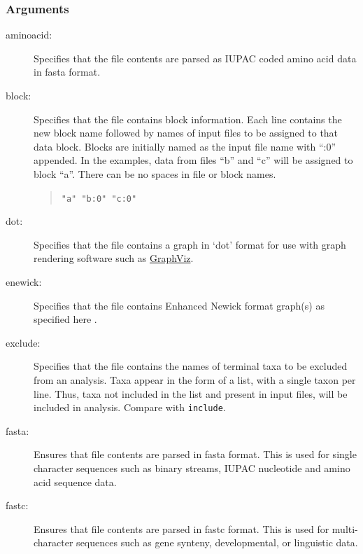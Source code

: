 	\subsubsection{Arguments}
	
	\begin{description}
		\item [aminoacid:] Specifies that the file contents are parsed as IUPAC coded amino 
		acid data in fasta \citep{PearsonandLipman1988} format.

		\item [block:] Specifies that the file contains block %
		information. Each line contains 
		the new block name followed by names of input files to be assigned to that data block. 
		Blocks are initially named as the input file name with ``:0'' appended. In the examples, 
		data from files ``b'' and ``c'' will be assigned to block ``a''. There can be no spaces in 
		file or block names.
			
			\begin{quote}
					\texttt{"a" "b:0" "c:0"}
			\end{quote}
	
		\item [dot:] Specifies that the file contains a graph in `dot' format for use with graph 
		rendering software such as \href{https://en.wikipedia.org/wiki/Graphviz}{GraphViz}.
			
		\item [enewick:] Specifies that the file contains Enhanced Newick format graph(s) as
		specified here \citep{Cardonaetal2008}. 
			
		\item [exclude:] Specifies that the file contains the names of terminal taxa to be 
		excluded from an analysis. Taxa appear in the form of a list, with a single taxon per 
		line. Thus, taxa not included in the list and present in input files, will be included in 
		analysis. Compare with \texttt{include}.
			
		\item [fasta:] Ensures that file contents are parsed in fasta \citep{PearsonandLipman1988}
		format. This is used for single character sequences such as binary streams, IUPAC 
		nucleotide and amino acid sequence data.
			
		\item [fastc:] Ensures that file contents are parsed in fastc \citep{WheelerandWashburn2019}
		format. This is used for multi-character sequences such as gene synteny, developmental, 
		or linguistic data.
			

\end{description}

